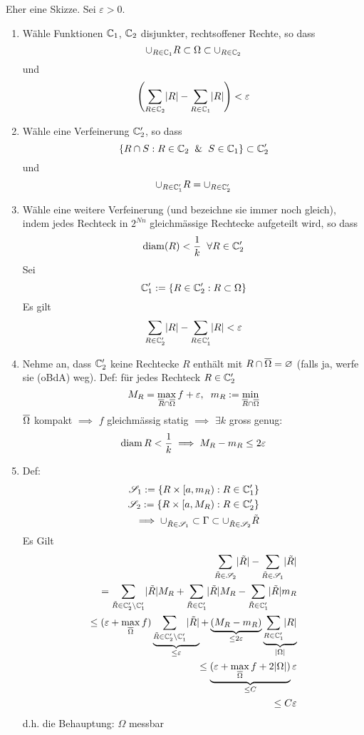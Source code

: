 \begin{Bew}
  Eher eine Skizze. Sei $\varepsilon>0$.
  \begin{enumerate}
    \item Wähle Funktionen $\mathbb{C}_1$, $\mathbb{C}_2$ disjunkter, rechtsoffener Rechte, so dass
      \[\cup_{R\in\mathbb{C}_1}R\subset \Omega \subset \cup_{R\in\mathbb{C}_2}\]
      und
      \[\left( \sum_{R\in\mathbb{C}_2}\mathopen| R \mathclose|-\sum_{R\in\mathbb{C}_1}\mathopen| R \mathclose| \right)<\varepsilon\]
    \item Wähle eine Verfeinerung $\mathbb{C}_2'$, so dass
      \[\left\{ R\cap S:R\in\mathbb{C}_2\hspace{2mm} \&\hspace{2mm} S\in\mathbb{C}_1 \right\}\subset\mathbb{C}_2'\]
      und
      \[\cup_{R\in\mathbb{C}_1'}R = \cup_{R\in\mathbb{C}_2'}\]
    \item Wähle eine weitere Verfeinerung (und bezeichne sie immer noch gleich), indem jedes Rechteck in $2^{Nn}$ gleichmässige Rechtecke aufgeteilt wird, so dass
      \[\operatorname{diam}(R)<\frac{1}{k}\hspace{2mm}\forall R\in\mathbb{C}_2'\]
      Sei 
      \[\mathbb{C}_1':=\left\{ R\in\mathbb{C}_2':R\subset\Omega \right\}\]
      Es gilt
      \[\sum_{R\in\mathbb{C}_2'}\mathopen| R \mathclose|-\sum_{R\in\mathbb{C}_1'}\mathopen| R \mathclose| < \varepsilon\]
    \item Nehme an, dass $\mathbb{C}_2'$ keine Rechtecke $R$ enthält mit $R\cap\overline{\Omega}=\varnothing$ (falls ja, werfe sie (oBdA) weg). Def: für jedes Rechteck $R\in\mathbb{C}_2'$
      \[M_R=\max_{\overline{R}\cap\overline{\Omega}}f+\varepsilon, \hspace{2mm} m_R:=\min_{\overline{R}\cap\overline{\Omega}}\]
      $\overline{\Omega}$ kompakt $\implies$ $f$ gleichmässig statig $\implies$ $\exists k$ gross genug:
      \[\operatorname{diam} R<\frac{1}{k}\implies M_R-m_R\leq 2\varepsilon\]
    \item Def:
      \begin{eqnarray*}
        \mathscr{S}_1:=\left\{ R\times [a,m_R):R\in\mathbb{C}_1'\right\}\\
        \mathscr{S}_2:=\left\{ R\times [a,M_R):R\in\mathbb{C}_2'\right\}\\
        \implies \cup_{\tilde R\in\mathscr{S}_1}\subset\Gamma\subset\cup_{\tilde R\in\mathscr{S}_2}\tilde R
      \end{eqnarray*}
      Es Gilt
      \begin{eqnarray*}
        \sum_{\tilde R\in \mathscr{S}_2}\mathopen| \tilde R \mathclose| -\sum_{\tilde R\in \mathscr{S}_1}\mathopen| \tilde R \mathclose|\\
        = \sum_{\tilde R\in \mathbb{C}_2'\setminus\mathbb{C}_1'}\mathopen| \tilde R \mathclose|M_R + \sum_{\tilde R\in \mathbb{C}_1'}\mathopen| \tilde R \mathclose|M_R-\sum_{\tilde R\in \mathbb{C}_1'}\mathopen| \tilde R \mathclose|m_R\\
        \leq (\varepsilon+\max_{\overline{\Omega}}f)\underbrace{\sum_{\tilde R\in \mathbb{C}_2'\setminus\mathbb{C}_1'}\mathopen| \tilde R \mathclose|}_{\leq \varepsilon}+\underbrace{(M_R-m_R)}_{\leq 2\varepsilon}\underbrace{\sum_{R\in\mathbb{C}_1'}\mathopen| R \mathclose|}_{\mathopen| \Omega \mathclose|}\\
        \leq \underbrace{(\varepsilon+\max_{\overline{\Omega}}f+2\mathopen| \Omega \mathclose|)}_{\leq C}\varepsilon\\
        \leq C\varepsilon
      \end{eqnarray*}
      d.h. die Behauptung: $\Omega$ messbar
  \end{enumerate}
\end{Bew}
